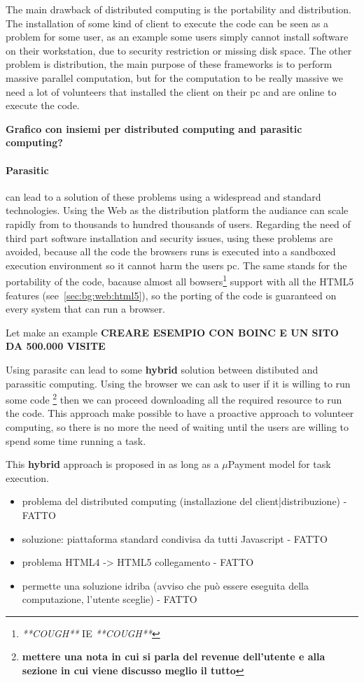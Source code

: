 The main drawback of distributed computing is the portability and distribution.
The installation of some kind of client to execute the code can be seen as a problem for some
user, as an example some users simply cannot install software on their workstation, due to security
restriction or missing disk space. The other problem is distribution, the main purpose of these
frameworks is to perform massive parallel computation, but for the computation to be really 
massive we need a lot of volunteers that installed the client on their pc and are online to execute
the code.

{\bf Grafico con insiemi per distributed computing and parasitic computing?}

\paragraph{Parasitic \js{}} can lead to a solution of these problems using a widespread
and standard technologies. Using the Web as the distribution platform the audiance can scale
rapidly from to thousands to hundred thousands of users. Regarding the need of third part software
installation and security issues, using \js{} these problems are avoided, because all the code the browsers
runs is executed into a sandboxed execution environment so it cannot harm the users pc. The same stands
for the portability of the code, bacause almost all bowsers\footnote{\emph{**COUGH**} IE \emph{**COUGH**}} support
\js{} with all the HTML5 features (see~\ref{sec:bg:web:html5}), so the porting of the code
is guaranteed on every system that can run a browser.


Let make an example \textbf{CREARE ESEMPIO CON BOINC E UN SITO DA 500.000 VISITE}

Using parasitc \js{} can lead to some \textbf{hybrid} solution between distibuted and
parassitic computing. Using the browser we can ask to user if it is willing to run some code
\footnote{\textbf{mettere una nota in cui si parla del revenue dell'utente e alla sezione in cui viene discusso
meglio il tutto}} then we can proceed downloading all the required resource to run the code.
This approach make possible to have a proactive approach to volunteer computing, so there is no more the
need of waiting until the users are willing to spend some time running a task.

This \textbf{hybrid} approach is proposed in \cite{karame2011pay} as long as a $\mu$Payment model
for task execution.


\begin{itemize}
	\item problema del distributed computing (installazione del client|distribuzione) - FATTO
	\item soluzione: piattaforma standard condivisa da tutti Javascript - FATTO
	\item problema HTML4 -> HTML5 collegamento - FATTO
	\item permette una soluzione idriba (avviso che può essere eseguita della computazione, l'utente sceglie) - FATTO
\end{itemize}